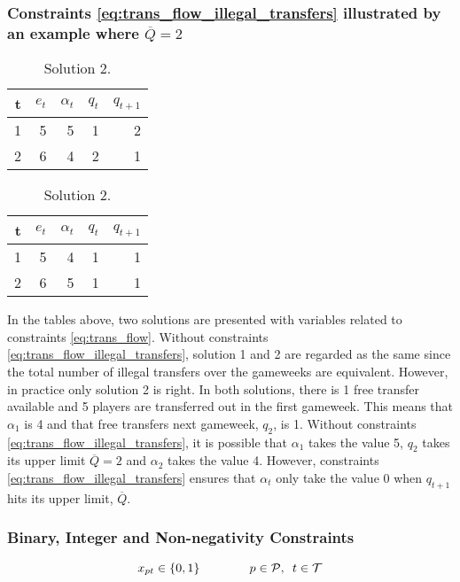 \subsubsection{Constraints \eqref{eq:trans_flow_illegal_transfers} illustrated by an example where $\overline{Q} = 2$}

\begin{table}[H]
\parbox{.45\linewidth}{
\centering
\begin{tabular}{@{}|r|r|r|r|r|@{}}
\hline
t   & $e_{t}$  & $\alpha_{t}$  & $q_{t}$  & $q_{t+1}$   \\
\hline
1  & 5  & 5  & 1  & 2   \\
\hline
2  & 6  & 4  & 2  & 1   \\
\hline
\end{tabular}
\caption*{Solution 1.}
}
\hfill
\parbox{.45\linewidth}{
\centering
\begin{tabular}{@{}|r|r|r|r|r|@{}}
\hline
t   & $e_{t}$  & $\alpha_{t}$  & $q_{t}$  & $q_{t+1}$   \\
\hline
1  & 5  & 4  & 1  & 1   \\
\hline
2  & 6  & 5  & 1  & 1   \\
\hline
\end{tabular}
\caption*{Solution 2.}
}
\end{table}

In the tables above, two solutions are presented with variables related to constraints \eqref{eq:trans_flow}. Without constraints \eqref{eq:trans_flow_illegal_transfers}, solution 1 and 2 are regarded as the same since the total number of illegal transfers over the gameweeks are equivalent. However, in practice only solution 2 is right. In both solutions, there is 1 free transfer available and 5 players are transferred out in the first gameweek. This means that $\alpha_{1}$ is 4 and that free transfers next gameweek, $q_{2}$, is 1. Without constraints \eqref{eq:trans_flow_illegal_transfers}, it is possible that $\alpha_{1}$ takes the value 5, $q_{2}$ takes its upper limit $\overline{Q} = 2$ and $\alpha_{2}$ takes the value 4. However, constraints \eqref{eq:trans_flow_illegal_transfers} ensures that $\alpha_{t}$ only take the value 0 when $q_{t+1}$ hits its upper limit, $\overline{Q}$. 

\subsubsection{Binary, Integer and Non-negativity Constraints}

\begin{equation} \label{eq:bin_x}
    x_{pt} \in \{0,1\} \qquad\qquad p \in \mathcal{P}, \enskip t \in \mathcal{T}
\end{equation}

